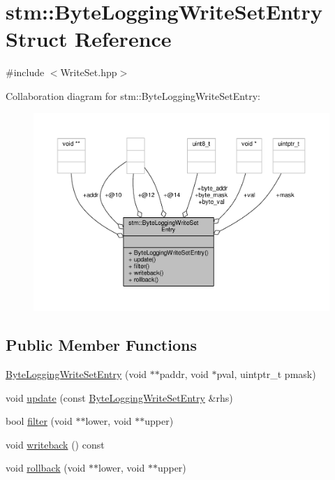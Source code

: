 \hypertarget{structstm_1_1ByteLoggingWriteSetEntry}{\section{stm\-:\-:Byte\-Logging\-Write\-Set\-Entry Struct Reference}
\label{structstm_1_1ByteLoggingWriteSetEntry}
}


{\ttfamily \#include $<$Write\-Set.\-hpp$>$}



Collaboration diagram for stm\-:\-:Byte\-Logging\-Write\-Set\-Entry\-:
\nopagebreak
\begin{figure}[H]
\begin{center}
\leavevmode
\includegraphics[width=350pt]{structstm_1_1ByteLoggingWriteSetEntry__coll__graph}
\end{center}
\end{figure}
\subsection*{Public Member Functions}
\begin{DoxyCompactItemize}
\item 
\hyperlink{structstm_1_1ByteLoggingWriteSetEntry_aa8765f8ceb760044167dec726bfb627b}{Byte\-Logging\-Write\-Set\-Entry} (void $\ast$$\ast$paddr, void $\ast$pval, uintptr\-\_\-t pmask)
\item 
void \hyperlink{structstm_1_1ByteLoggingWriteSetEntry_ab84cdd6ad2389feb1c1db539b70d20d0}{update} (const \hyperlink{structstm_1_1ByteLoggingWriteSetEntry}{Byte\-Logging\-Write\-Set\-Entry} \&rhs)
\item 
bool \hyperlink{structstm_1_1ByteLoggingWriteSetEntry_a19a286d251238425dd8f758f3c0b57eb}{filter} (void $\ast$$\ast$lower, void $\ast$$\ast$upper)
\item 
void \hyperlink{structstm_1_1ByteLoggingWriteSetEntry_aa106b80568ffae20531ef50e0f586fe6}{writeback} () const 
\item 
void \hyperlink{structstm_1_1ByteLoggingWriteSetEntry_a678f504f874f22425ab2bdd4486dddd3}{rollback} (void $\ast$$\ast$lower, void $\ast$$\ast$upper)
\end{DoxyCompactItemize}

